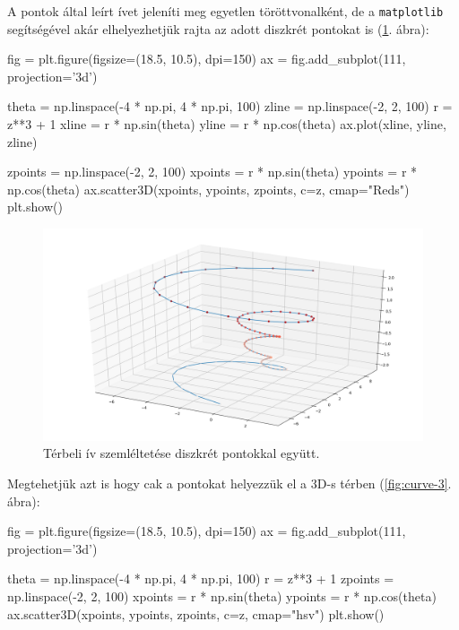 A pontok által leírt ívet jeleníti meg egyetlen
töröttvonalként, de a \texttt{matplotlib} segítségével akár elhelyezhetjük rajta az adott diszkrét
pontokat is (\ref{fig:curve-2}. ábra):
\begin{python}
fig = plt.figure(figsize=(18.5, 10.5), dpi=150)
ax = fig.add_subplot(111, projection='3d')

theta = np.linspace(-4 * np.pi, 4 * np.pi, 100)
zline = np.linspace(-2, 2, 100)
r = z**3 + 1
xline = r * np.sin(theta)
yline = r * np.cos(theta)
ax.plot(xline, yline, zline)

zpoints = np.linspace(-2, 2, 100)
xpoints = r * np.sin(theta)
ypoints = r * np.cos(theta)
ax.scatter3D(xpoints, ypoints, zpoints, c=z, cmap="Reds")
plt.show()
\end{python}

\begin{figure}[h!]
\centering
\includegraphics[width=\textwidth]{img/curve-2.png}
\caption{Térbeli ív szemléltetése diszkrét pontokkal együtt.}
\label{fig:curve-2}
\end{figure}
    
Megtehetjük azt is hogy cak a pontokat helyezzük el a 3D-s térben (\ref{fig:curve-3}. ábra):
\begin{python}
fig = plt.figure(figsize=(18.5, 10.5), dpi=150)
ax = fig.add_subplot(111, projection='3d')

theta = np.linspace(-4 * np.pi, 4 * np.pi, 100)
r = z**3 + 1
zpoints = np.linspace(-2, 2, 100)
xpoints = r * np.sin(theta)
ypoints = r * np.cos(theta)
ax.scatter3D(xpoints, ypoints, zpoints, c=z, cmap="hsv")
plt.show()
\end{python}

